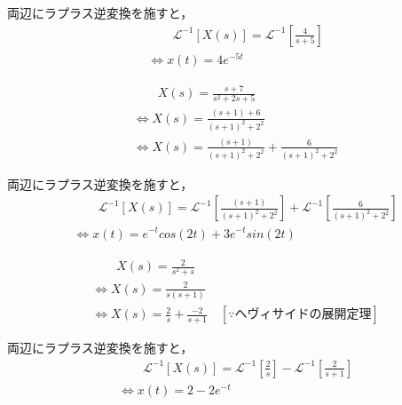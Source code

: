 \documentclass[a4paper,12pt]{article}
\begin{document}
\begin{tcolorbox}[title={ [16] (1) \( X(s)=\frac{4}{s+5} \)}]
  \quad 両辺にラプラス逆変換を施すと，
\vspace{-3mm}
\begin{align*}
    &\qquad \mathcal{L}^{-1} \left[ X(s) \right] 
    =\mathcal{L}^{-1} \left[ \frac{4}{s+5} \right] \\
    &\Leftrightarrow x(t) = 4 e^{-5t}
\end{align*}
\end{tcolorbox}
\begin{tcolorbox}[title={ [16] (2) \( X(s)=\frac{ s + 7 }{ s^2 + 2s + 5} \)}]
  \vspace{-3mm}
\begin{align*}
    &\qquad X(s) =\frac{ s + 7 }{ s^2 + 2s + 5}  \\
    &\Leftrightarrow X(s) =\frac{ (s + 1) + 6 }{ ( s + 1 )^2+ 2^2} \\
    &\Leftrightarrow X(s) 
    = \frac{ (s + 1) }{ ( s + 1 )^2+ 2^2}
    + \frac{ 6 }{ ( s + 1 )^2+ 2^2} 
\end{align*}

\quad 両辺にラプラス逆変換を施すと，
\vspace{-3mm}
\begin{align*}
    &\qquad \mathcal{L}^{-1} \left[ X(s) \right] 
    =\mathcal{L}^{-1} \left[ \frac{ (s + 1) }{ ( s + 1 )^2+ 2^2} \right]
    +\mathcal{L}^{-1} \left[ \frac{ 6  }{ ( s + 1 )^2+ 2^2} \right] \\
    &\Leftrightarrow x(t) = e^{-t} cos(2t) +3 e^{-t} sin(2t)
\end{align*}
\end{tcolorbox}
\begin{tcolorbox}[title={ [16] (3) \( X(s)=\frac{ 2 }{ s^2 + s } \)}]
  \vspace{-3mm}
\begin{align*}
    &\qquad X(s) =\frac{ 2 }{ s^2 + s }  \\
    &\Leftrightarrow X(s) =\frac{ 2 }{ s(s+1) }  \\
    &\Leftrightarrow X(s) 
    = \frac{2}{s}
    + \frac{-2}{s + 1} 
    \quad [\because ヘヴィサイドの展開定理]
\end{align*}

\quad 両辺にラプラス逆変換を施すと，
\vspace{-3mm}
\begin{align*}
    &\qquad \mathcal{L}^{-1} \left[ X(s) \right] 
    =\mathcal{L}^{-1} \left[ \frac{2}{s} \right]
    -\mathcal{L}^{-1} \left[ \frac{2}{s + 1} \right] \\
    &\Leftrightarrow x(t) = 2 - 2 e^{-t}
\end{align*}\end{tcolorbox}
\end{document}
